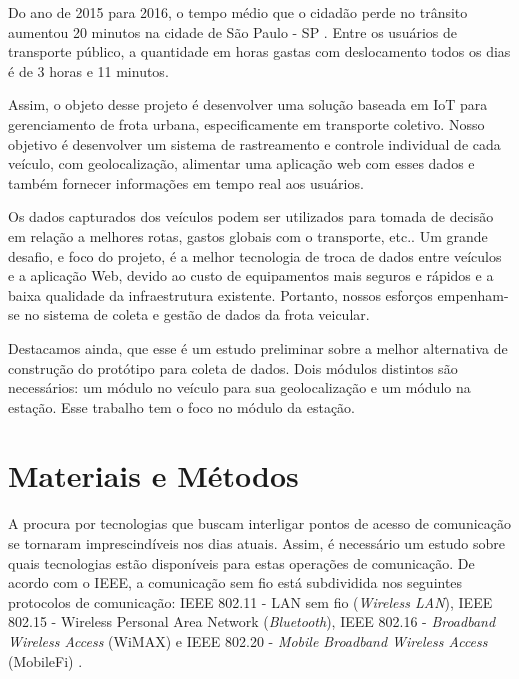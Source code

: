 \documentclass[12pt]{uftpibicsic2018}
\begin{document}
Do ano de 2015 para 2016, o tempo médio que o cidadão perde no trânsito aumentou 20 minutos na cidade de São Paulo - SP \cite{veja_tempo_sp}. Entre os usuários de transporte público, a quantidade em horas gastas com deslocamento todos os dias é de 3 horas e 11 minutos.


Assim, o objeto desse projeto é desenvolver uma solução baseada em IoT para gerenciamento de frota urbana, especificamente em transporte coletivo. Nosso objetivo é desenvolver um sistema de rastreamento e controle individual de cada veículo, com geolocalização, alimentar uma aplicação web com esses dados e também fornecer informações em tempo real aos usuários. 

Os dados capturados dos veículos podem ser utilizados para tomada de decisão em relação a melhores rotas, gastos globais com o transporte, etc.. Um grande desafio, e foco do projeto, é a melhor tecnologia de troca de dados entre veículos e a aplicação Web, devido ao custo de equipamentos mais seguros e rápidos e a baixa qualidade da infraestrutura existente. Portanto, nossos esforços empenham-se no sistema de coleta e gestão de dados da frota veicular.

Destacamos ainda, que esse é um estudo preliminar sobre a melhor alternativa de construção do protótipo para coleta de dados. Dois módulos distintos são necessários: um módulo no veículo para sua geolocalização e um módulo na estação. Esse trabalho tem o foco no módulo da estação. %

\chapter{Materiais e Métodos}\vskip -12pt

A procura por tecnologias que buscam interligar pontos de acesso de comunicação se tornaram imprescindíveis nos dias atuais. Assim, é necessário um estudo sobre quais tecnologias estão disponíveis para estas operações de comunicação. De acordo com o IEEE, a comunicação sem fio está subdividida nos seguintes protocolos de comunicação: IEEE 802.11 - LAN sem fio ({\it Wireless LAN}), IEEE 802.15 - Wireless Personal Area Network ({\it Bluetooth}), IEEE 802.16 - {\it Broadband Wireless Access} (WiMAX) e IEEE 802.20 - {\it Mobile Broadband Wireless Access} (MobileFi) \cite{marcos}.
\end{document}
